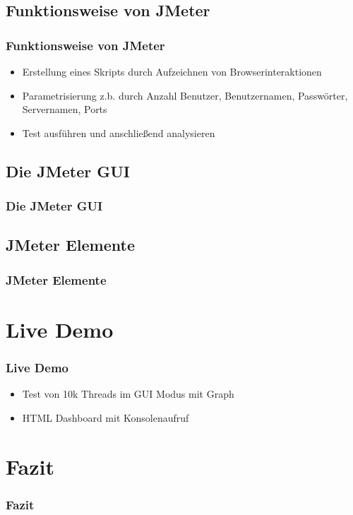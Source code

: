 \documentclass[xcolor=dvipsnames]{beamer}
\begin{document}
\subsection{Funktionsweise von JMeter}
\begin{frame}
\frametitle{Funktionsweise von JMeter}
\begin{itemize}
\item Erstellung eines Skripts durch Aufzeichnen von Browserinteraktionen
\item Parametrisierung z.b. durch Anzahl Benutzer, Benutzernamen, Passwörter, Servernamen, Ports
\item Test ausführen und anschließend analysieren 
\end{itemize}
\end{frame}

\subsection{Die JMeter GUI}
\begin{frame}
\frametitle{Die JMeter GUI}
\end{frame}

\subsection{JMeter Elemente}
\begin{frame}
\frametitle{JMeter Elemente}
\end{frame}

\section{Live Demo}
\begin{frame}
\frametitle{Live Demo}
\begin{itemize}
	\item Test von 10k Threads im GUI Modus mit Graph 
	\item HTML Dashboard mit Konsolenaufruf
\end{itemize}
\end{frame}

 
\section{Fazit}
\begin{frame}
\frametitle{Fazit}
\end{frame}
\end{document}
